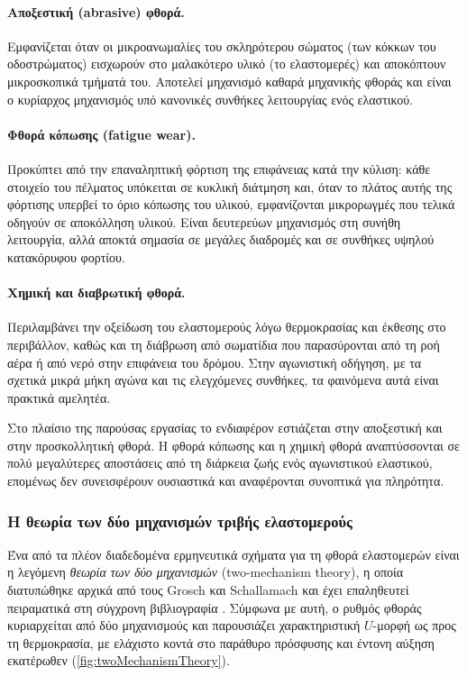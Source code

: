 \paragraph{Αποξεστική (abrasive) φθορά.}
Εμφανίζεται όταν οι μικροανωμαλίες του σκληρότερου σώματος (των κόκκων του
οδοστρώματος) εισχωρούν στο μαλακότερο υλικό (το ελαστομερές) και αποκόπτουν
μικροσκοπικά τμήματά του. Αποτελεί μηχανισμό καθαρά μηχανικής φθοράς και είναι
ο κυρίαρχος μηχανισμός υπό κανονικές συνθήκες λειτουργίας ενός
ελαστικού.

\paragraph{Φθορά κόπωσης (fatigue wear).}
Προκύπτει από την επαναληπτική φόρτιση της επιφάνειας κατά την κύλιση: κάθε στοιχείο του
πέλματος υπόκειται σε κυκλική διάτμηση και, όταν το πλάτος αυτής
της φόρτισης υπερβεί το όριο κόπωσης του υλικού, εμφανίζονται μικρορωγμές που τελικά
οδηγούν σε αποκόλληση υλικού. Είναι δευτερεύων μηχανισμός στη συνήθη λειτουργία, αλλά
αποκτά σημασία σε μεγάλες διαδρομές και σε συνθήκες υψηλού κατακόρυφου φορτίου.

\paragraph{Χημική και διαβρωτική φθορά.}
Περιλαμβάνει την οξείδωση του ελαστομερούς λόγω θερμοκρασίας και έκθεσης στο περιβάλλον,
καθώς και τη διάβρωση από σωματίδια που παρασύρονται από τη ροή αέρα ή από νερό στην
επιφάνεια του δρόμου. Στην αγωνιστική οδήγηση, με τα σχετικά μικρά μήκη αγώνα και τις
ελεγχόμενες συνθήκες, τα φαινόμενα αυτά είναι πρακτικά αμελητέα.

Στο πλαίσιο της παρούσας εργασίας το ενδιαφέρον εστιάζεται στην αποξεστική και στην
προσκολλητική φθορά. Η φθορά κόπωσης και η χημική φθορά αναπτύσσονται σε πολύ μεγαλύτερες
αποστάσεις από τη διάρκεια ζωής ενός αγωνιστικού ελαστικού, επομένως δεν συνεισφέρουν ουσιαστικά
και αναφέρονται συνοπτικά για πληρότητα.

\subsubsection{Η θεωρία των δύο μηχανισμών τριβής ελαστομερούς}
\label{subsubsec:two_mechanism}

Ένα από τα πλέον διαδεδομένα ερμηνευτικά σχήματα για τη φθορά ελαστομερών είναι η λεγόμενη
\emph{θεωρία των δύο μηχανισμών} (two-mechanism theory), η οποία διατυπώθηκε αρχικά από
τους Grosch και Schallamach \cite{Grosch1963} και έχει επαληθευτεί πειραματικά στη σύγχρονη
βιβλιογραφία \cite{Veirh1992,West2022}. Σύμφωνα με αυτή, ο ρυθμός φθοράς κυριαρχείται από
δύο μηχανισμούς και παρουσιάζει χαρακτηριστική $U$-μορφή ως προς τη θερμοκρασία, με ελάχιστο
κοντά στο παράθυρο πρόσφυσης και έντονη αύξηση εκατέρωθεν (\cref{fig:twoMechanismTheory}).


